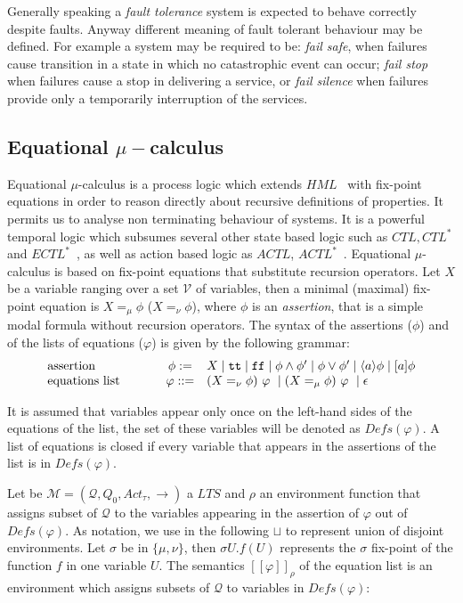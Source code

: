 \documentclass{entcs}
\newcommand{\lts}{\mathit{LTS}}
\newcommand{\defs}{\mathit{Defs}}
\newcommand{\dia}[1]{\langle #1 \rangle}
\newcommand{\sem}[1]{[\![#1]\!]}
\newcommand{\ar}        {\longrightarrow}
\newcommand{\trans}[1]{\stackrel{#1}{\ar}}
\newcommand{\ltsQ}{\mathcal{Q}}
\newcommand{\ltsq}{Q}
\newcommand{\true}{\mathtt {tt}}
\newcommand{\false}{\mathtt {ff}}
\begin{document}
Generally speaking a \emph{fault tolerance} system is expected to behave
correctly despite faults.  Anyway different meaning of fault tolerant
behaviour may be defined. For example a system may be required to be:
\emph{fail safe}, when failures cause transition in a state in which no
catastrophic event can occur; \emph{fail stop} when failures cause a
stop in delivering a service, or \emph{fail silence} when failures
provide only a temporarily interruption of the services.

\subsection{Equational $\mu-$calculus}
\label{logsec}
Equational $\mu$-calculus is a process logic which extends
$\mathit{HML}$~\cite{HM85:acm} with fix-point equations in order to reason
directly about recursive definitions of properties. It permits us to analyse
non terminating behaviour of systems.  It is a powerful temporal logic which
subsumes several other state based logic such as $CTL,CTL^{*}$ and
$ECTL^{*}$~\cite{emerson}, as well as action based logic as $ACTL$,
$ACTL^{*}$~\cite{DV90:lncs}. Equational $\mu$-calculus is based on fix-point
equations that substitute recursion operators. Let $X$ be a variable ranging
over a set $\mathcal{V}$ of variables, then a minimal (maximal) fix-point
equation is $X =_{\mu} \phi$ ($X=_{\nu} \phi$), where $\phi$ is an
\emph{assertion}, that is a simple modal formula without recursion operators.
The syntax of the assertions ($\phi$) and of the lists of equations
($\varphi$) is given by the following grammar:
%
$$
\begin{array}{p{3cm}cl}
\emph{assertion} & \phi:= &  X \mid \true \mid \false \mid
\phi\wedge \phi' \mid \phi\vee \phi' \mid \dia{a}\phi \mid [a]\phi  \\
\emph{equations list} & \varphi::= & (X =_{\nu} \phi) \ \varphi\ \mid (X =_{\mu} \phi) \ \varphi \ \mid  \epsilon
\end{array}
$$%

It is assumed that variables appear only once on the left-hand sides of the
equations of the list, the set of these variables will be denoted as
$\defs(\varphi)$. A list of equations is closed if every variable that appears
in the assertions of the list is in $\defs(\varphi)$.

Let be $\mathcal{M} = (\ltsQ, \ltsq_0, Act_\tau, \trans{}) $ a $\lts$ and
$\rho$ an environment function that assigns subset of $\ltsQ$ to the variables
appearing in the assertion of $\varphi$ out of $\defs(\varphi)$.  As notation,
we use in the following $\sqcup$ to represent union of disjoint environments.
Let $\sigma$ be in $\{\mu,\nu\}$, then $\sigma U.f(U)$ represents the $\sigma$
fix-point of the function $f$ in one variable $U$. The semantics
$\sem{\varphi}_{\rho}$ of the equation list is an environment which assigns
subsets of $\ltsQ$ to variables in $\defs(\varphi)$:
\end{document}
